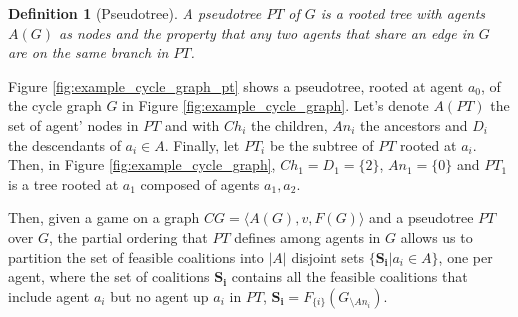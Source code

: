 \documentclass{aamas2012}
\newtheorem{definition}{Definition}
\begin{document}
\begin{definition}[Pseudotree]
A pseudotree
$PT$ of $G$ is a rooted tree with agents $A(G)$ as nodes and the property that
any two agents that share an edge in $G$ are on the same branch in $PT$.
\end{definition}

Figure \ref{fig:example_cycle_graph_pt} shows a pseudotree, rooted at agent
$a_0$, of the cycle graph $G$ in Figure \ref{fig:example_cycle_graph}. 
Let's denote $A(PT)$ the set of agent' nodes in $PT$ and with $Ch_i$ the
children, $An_i$ the ancestors and $D_i$ the descendants of $a_i\in A$. Finally,
let $PT_i$ be the subtree of $PT$ rooted at $a_i$. 
Then, in Figure \ref{fig:example_cycle_graph},
$Ch_{1}=D_{1}=\{2\}$, $An_{1}=\{0\}$ and $PT_1$ is a tree rooted at
$a_1$ composed of agents $a_1,a_2$.


Then, given a game on a graph $CG=\langle A(G), v, F(G) \rangle$ and a
pseudotree $PT$ over $G$,
the partial ordering that $PT$ defines among agents in $G$ allows us to
partition the set of feasible coalitions into $\vert A \vert$ disjoint sets $\{\mathbf{S_i}\vert
a_i \in A\}$, one per agent, where the set of coalitions $\mathbf{S_i}$
contains all the feasible coalitions that include agent $a_i$ but no agent up $a_i$ in $PT$,
$\mathbf{S_i} = F_{\{i\}}(G_{\setminus An_i}) $.

\end{document}
